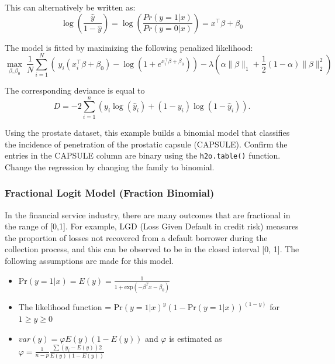 This can alternatively be written as: 
$$  \log \left( \frac{\hat{y}}{ 1- \hat{y} } \right)  = \log \left(  \frac{Pr(y=1|x)}{Pr(y=0|x)}   \right) = x^{\top} \beta + \beta_0$$

The model is fitted by maximizing the following penalized likelihood: 
$$  \max_{\beta,\beta_0} \  \frac{1}{N} \sum_{i=1}^{N} \left( \ y_i (x_i^{\top}\beta  + \beta_0) - \log (1 + e^{x_i^{\top}\beta  + \beta_0} ) \right)  - \lambda \left( \alpha \|\beta \|_1 +  \frac{1}{2}(1- \alpha)  \| \beta \|_2^2 \right)$$

The corresponding deviance is equal to 
$$D = -2\sum_{i=1}^{n} \left(y_i \log(\hat{y}_i) + (1 - y_i)\log(1-\hat{y}_i)  \right).$$

Using the prostate dataset, this example builds a binomial model that classifies the incidence of penetration of the prostatic
capsule (CAPSULE). Confirm the entries in the CAPSULE column are binary using the \texttt{h2o.table()}
function. Change the regression by changing the family to binomial.

\waterExampleInR


\waterExampleInPython



\subsubsection{Fractional Logit Model (Fraction Binomial)}

In the financial service industry, there are many outcomes that are fractional in the range of [0,1]. For example, LGD (Loss Given Default in credit risk) measures the proportion of losses not recovered from a default borrower during the collection process, and this can be observed to be in the closed interval [0, 1]. The following assumptions are made for this model.

\begin{itemize}
\item $\text{Pr}(y=1|x) = E(y) = \frac{1}{1 + \text{exp}(-\beta^T x-\beta_0)}$
\item The likelihood function = $\text{Pr}{(y=1|x)}^y (1-\text{Pr}(y=1|x))^{(1-y)}$ for $1 \geq y \geq 0$
\item $var(y) = \varphi E(y)(1-E(y))$ and $\varphi$ is estimated as $\varphi = \frac{1}{n-p} \frac{\sum {(y_i - E(y))}2} {E(y)(1-E(y))}$
\end{itemize}

